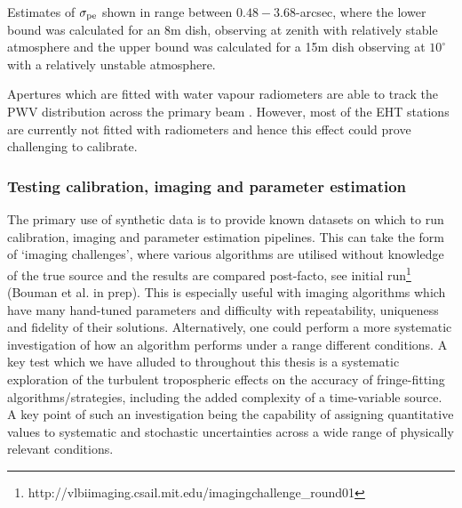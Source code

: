 Estimates of $\sigma_{\rm pe}$ shown in \citet{Holdaway_1998} range between $0.48-3.68$-arcsec, where the lower bound was calculated for an 8m dish, observing at zenith with relatively stable atmosphere and the upper bound was calculated for a 15m dish observing at $10^\circ$ with a relatively unstable atmosphere.  

Apertures which are fitted with water vapour radiometers are able to track the PWV distribution across the primary beam \citep{Lamb_1998}. However, most of the EHT stations are currently not fitted with radiometers and hence this effect could prove challenging to calibrate.

\subsubsection{Testing calibration, imaging and parameter estimation}

The primary use of synthetic data is to provide known datasets on which to run calibration, imaging and parameter estimation pipelines. This can take the form of `imaging challenges', where various algorithms are utilised without knowledge of the true source and the results are compared post-facto, see initial run\footnote{http://vlbiimaging.csail.mit.edu/imagingchallenge\_round01} (Bouman et al. in prep). This is especially useful with imaging algorithms which have many hand-tuned parameters and difficulty with repeatability, uniqueness and fidelity of their solutions. Alternatively, one could perform a more systematic investigation of how an algorithm performs under a range different conditions. A key test which we have alluded to throughout this thesis is a systematic exploration of the turbulent tropospheric effects on the accuracy of fringe-fitting algorithms/strategies, including the added complexity of a time-variable source. A key point of such an investigation being the capability of assigning quantitative values to systematic and stochastic uncertainties across a wide range of physically relevant conditions.



